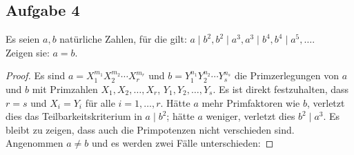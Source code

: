 \subsection{Aufgabe 4}
Es seien $a, b$ natürliche Zahlen, für die gilt:
$a \mid b^2, b^2 \mid a^3, a^3 \mid b^4, b^4 \mid a^5, \dots$.\\
Zeigen sie: $a = b$.
\begin{proof}
  Es sind $a = X_1^{m_1}X_2^{m_2} \dotsm X_r^{m_r}$ und
  $b = Y_1^{n_1}Y_2^{n_2} \dotsm Y_s^{n_s}$ die Primzerlegungen von $a$ und $b$
  mit Primzahlen $X_1,X_2,\dotsc,X_r$, $Y_1,Y_2,\dotsc,Y_s$.
  Es ist direkt festzuhalten, dass $r = s$ und $X_i = Y_i$ für alle
  $i = 1,\dotsc,r$. Hätte $a$ mehr Primfaktoren wie $b$,
  verletzt dies das Teilbarkeitskriterium \parencite[33]{book:zahlentheorie} in $a \mid b^2$;
  hätte $a$ weniger, verletzt dies $b^2 \mid a^3$.
  Es bleibt zu zeigen, dass auch die Primpotenzen nicht verschieden sind.
  Angenommen $a \neq b$ und es werden zwei Fälle unterschieden:


\end{proof}
